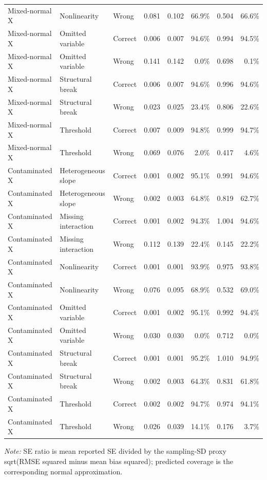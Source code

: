 \begin{table}[htbp]
{\begin{tabular}{@{}lllrrrrr@{}}
Mixed-normal X & Nonlinearity & Wrong & 0.081 & 0.102 & 66.9\% & 0.504 & 66.6\% \\
Mixed-normal X & Omitted variable & Correct & 0.006 & 0.007 & 94.6\% & 0.994 & 94.5\% \\
Mixed-normal X & Omitted variable & Wrong & 0.141 & 0.142 & 0.0\% & 0.698 & 0.1\% \\
Mixed-normal X & Structural break & Correct & 0.006 & 0.007 & 94.6\% & 0.996 & 94.6\% \\
Mixed-normal X & Structural break & Wrong & 0.023 & 0.025 & 23.4\% & 0.806 & 22.6\% \\
Mixed-normal X & Threshold & Correct & 0.007 & 0.009 & 94.8\% & 0.999 & 94.7\% \\
Mixed-normal X & Threshold & Wrong & 0.069 & 0.076 & 2.0\% & 0.417 & 4.6\% \\
\addlinespace
Contaminated X & Heterogeneous slope & Correct & 0.001 & 0.002 & 95.1\% & 0.991 & 94.6\% \\
Contaminated X & Heterogeneous slope & Wrong & 0.002 & 0.003 & 64.8\% & 0.819 & 62.7\% \\
Contaminated X & Missing interaction & Correct & 0.001 & 0.002 & 94.3\% & 1.004 & 94.6\% \\
Contaminated X & Missing interaction & Wrong & 0.112 & 0.139 & 22.4\% & 0.145 & 22.2\% \\
Contaminated X & Nonlinearity & Correct & 0.001 & 0.001 & 93.9\% & 0.975 & 93.8\% \\
Contaminated X & Nonlinearity & Wrong & 0.076 & 0.095 & 68.9\% & 0.532 & 69.0\% \\
Contaminated X & Omitted variable & Correct & 0.001 & 0.002 & 95.1\% & 0.992 & 94.4\% \\
Contaminated X & Omitted variable & Wrong & 0.030 & 0.030 & 0.0\% & 0.712 & 0.0\% \\
Contaminated X & Structural break & Correct & 0.001 & 0.001 & 95.2\% & 1.010 & 94.9\% \\
Contaminated X & Structural break & Wrong & 0.002 & 0.003 & 64.3\% & 0.831 & 61.8\% \\
Contaminated X & Threshold & Correct & 0.002 & 0.002 & 94.7\% & 0.974 & 94.1\% \\
Contaminated X & Threshold & Wrong & 0.026 & 0.039 & 14.1\% & 0.176 & 3.7\% \\
\bottomrule
\end{tabular}%
}
\par\smallskip
\begin{minipage}{0.96\linewidth}
\footnotesize
\textit{Note:} SE ratio is mean reported SE divided by the sampling-SD proxy sqrt(RMSE squared minus mean bias squared); predicted coverage is the corresponding normal approximation.
\end{minipage}
\end{table}
